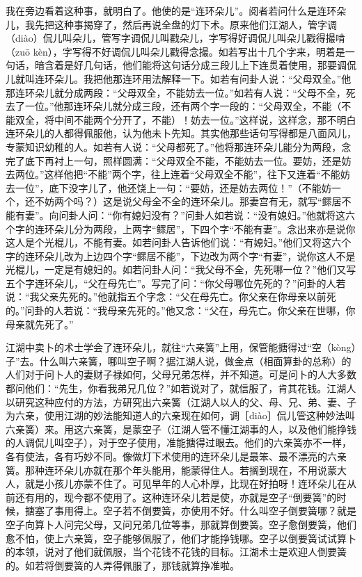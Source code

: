 \documentclass[12pt,UTF8]{ctexbook}
\begin{document}
我在旁边看着这种事，就明白了。他使的是“连环朵儿”。阅者若问什么是连环朵儿，我先把这种事揭穿了，然后再说全盘的灯下术。原来他们江湖人，管字调（diào）侃儿叫朵儿，管写字调侃儿叫戳朵儿，字写得好调侃儿叫朵儿戳得撮啃（zuō kèn），字写得不好调侃儿叫朵儿戳得念撮。如若写出十几个字来，明着是一句话，暗含着是好几句话，他们能将这句话分成三段儿上下连贯着使用，那要调侃儿就叫连环朵儿。我把他那连环用法解释一下。如若有问卦人说：“父母双全。”他那连环朵儿就分成两段：“父母双全，不能妨去一位。”如若有人说：“父母不全，死去了一位。”他那连环朵儿就分成三段，还有两个字一段的：“父母双全，不能（不能双全，将中间不能两个分开了，不能）！妨去一位。”这样说，这样念，那不明白连环朵儿的人都得佩服他，认为他未卜先知。其实他那些话句写得都是八面风儿，专蒙知识幼稚的人。如若有人说：“父母都死了。”他将那连环朵儿能分为两段，念完了底下再衬上一句，照样圆满：“父母双全不能，不能妨去一位。要妨，还是妨去两位。”这样他把“不能”两个字，往上连着“父母双全不能”，往下又连着“不能妨去一位”，底下没字儿了，他还饶上一句：“要妨，还是妨去两位！”（不能妨一个，还不妨两个吗？）这是说父母全不全的连环朵儿。那妻宫有无，就写“鳏居不能有妻”。向问卦人问：“你有媳妇没有？”问卦人如若说：“没有媳妇。”他就将这六个字的连环朵儿分为两段，上两字“鳏居”，下四个字“不能有妻”。念出来亦是说你这人是个光棍儿，不能有妻。如若问卦人告诉他们说：“有媳妇。”他们又将这六个字的连环朵儿改为上边四个字“鳏居不能”，下边改为两个字“有妻”，说你这人不是光棍儿，一定是有媳妇的。如若问卦人问：“我父母不全，先死哪一位？”他们又写五个字连环朵儿，“父在母先亡”。写完了问：“你父母哪位先死的？”问卦的人若说：“我父亲先死的。”他就指五个字念：“父在母先亡。你父亲在你母亲以前死的。”问卦的人若说：“我母亲先死的。”他又念：“父在，母先亡。你父亲在世哪，你母亲就先死了。”

江湖中卖卜的术士学会了连环朵儿，就往“六亲簧”上用，保管能搪得过“空（kòng）子”去。什么叫六亲簧，哪叫空子啊？据江湖人说，做金点（相面算卦的总称）的人们对于问卜人的妻财子禄如何，父母兄弟怎样，并不知道。可是问卜的人大多数都问他们：“先生，你看我弟兄几位？”如若说对了，就信服了，肯其花钱。江湖人以研究这种应付的方法，方研究出六亲簧（江湖人以人的父、母、兄、弟、妻、子为六亲，使用江湖的妙法能知道人的六亲现在如何，调［diào］侃儿管这种妙法叫六亲簧）来。用这六亲簧，是蒙空子（江湖人管不懂江湖事的人，以及他们能挣钱的人调侃儿叫空子），对于空子使用，准能搪得过眼去。他们的六亲簧亦不一样，各有使法，各有巧妙不同。像做灯下术使用的连环朵儿是最笨、最不漂亮的六亲簧。那种连环朵儿亦就在那个年头能用，能蒙得住人。若搁到现在，不用说蒙大人，就是小孩儿亦蒙不住了。可见早年的人心朴厚，比现在好拍呀！连环朵儿在从前还有用的，现今都不使用了。这种连环朵儿若是使，亦就是空子“倒要簧”的时候，搪塞了事用得上。空子若不倒要簧，亦使用不好。什么叫空子倒要簧哪？就是空子向算卜人问完父母，又问兄弟几位等事，那就算倒要簧。空子愈倒要簧，他们愈不怕，使上六亲簧，空子能够佩服了，他们才能挣钱哪。空子以倒要簧试试算卜的本领，说对了他们就佩服，当个花钱不花钱的目标。江湖术士是欢迎人倒要簧的。如若将倒要簧的人弄得佩服了，那钱就算挣准啦。
\end{document}

